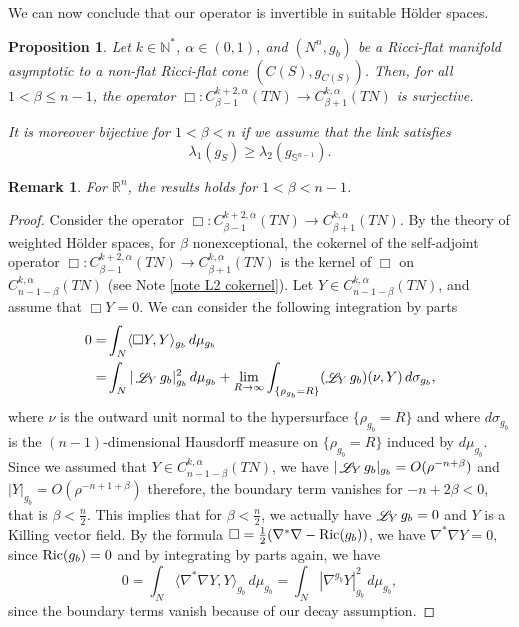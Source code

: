\documentclass[a4paper,11pt,reqno]{amsart}
\newtheorem{prop}[defn]{Proposition}
\newtheorem{rk}[defn]{Remark}
\def\Ric{\mathop{\rm Ric}\nolimits}
\def\Li{\mathop{\rm \mathscr{L}}\nolimits}
\def\Ric{\mathop{\rm Ric}\nolimits}
\def\Li{\mathop{\rm \mathscr{L}}\nolimits}
\numberwithin{equation}{section}
\begin{document}
	We can now conclude that our operator is invertible in suitable H\" older spaces.
	\begin{prop}\label{inverse deltadelta}
		Let $k\in \mathbb{N}^*$, $\alpha\in(0,1)$, and $(N^n,g_b)$ be a Ricci-flat manifold asymptotic to a non-flat Ricci-flat cone $(C(S),g_{C(S)})$. Then, for all $1<\beta\leq n-1$, the operator $\Box : C^{k+2,\alpha}_{\beta-1}(TN)\to C^{k,\alpha}_{\beta+1}(TN)$ is surjective. 
		
		It is moreover bijective for $1<\beta<n$ if we assume that the link satisfies
		$$\lambda_1(g_S)\geq \lambda_2(g_{\mathbb{S}^{n-1}}).$$
	\end{prop}
	\begin{rk}
		For $\mathbb{R}^n$, the results holds for $1<\beta<n-1$.
	\end{rk}
	\begin{proof}
		Consider the operator $\Box : C^{k+2,\alpha}_{\beta-1}(TN)\to C^{k,\alpha}_{\beta+1}(TN)$. By the theory of weighted Hölder spaces,  for $\beta$ nonexceptional, the cokernel of the self-adjoint operator $\Box: C^{k+2,\alpha}_{\beta-1}(TN)\to C^{k,\alpha}_{\beta+1}(TN)$ is the kernel of $\Box$ on $C^{k,\alpha}_{n-1-\beta}(TN)$ (see Note \ref{note L2 cokernel}). Let $Y\in C^{k,\alpha}_{n-1-\beta}(TN)$, and assume that $\Box Y=0$. We can consider the following integration by parts
		\begin{equation*}
		\begin{split}
		0=&\int_N \langle\Box Y,Y\rangle_{g_b}\,d\mu_{g_b} \\ =& \int_N |\Li_Yg_b|_{g_b}^2\,d\mu_{g_b}  + \lim_{R\to \infty} \int_{\{\rho_{g_b}= R\}} (\Li_Yg_b)(\nu,Y)\,d\sigma_{g_b} ,
		\end{split}
		\end{equation*}
		where $\nu$ is the outward  unit normal to the hypersurface $\{\rho_{g_b}= R\}$ and where $d\sigma_{g_b}$ is the $(n-1)$-dimensional Hausdorff measure on $\{\rho_{g_b}= R\}$ induced by $d\mu_{g_b}$. Since we assumed that $Y\in C^{k,\alpha}_{n-1-\beta}(TN)$, we have $|\Li_Yg_b|_{g_b} = O(\rho^{-n+\beta})$ and $|Y|_{g_b} =  O(\rho^{-n+1+\beta})$ therefore, the boundary term vanishes for $-n + 2\beta <0 $, that is $ \beta<\frac{n}{2}$. This implies that for $ \beta<\frac{n}{2}$, we actually have $\Li_Yg_b=0$ and $Y$ is a Killing vector field. By the formula $\Box = \frac{1}{2}(\nabla^*\nabla - \Ric(g_b))$, we have $\nabla^*\nabla Y = 0,$ since $\Ric(g_b)=0$ and by integrating by parts again, we have 
		\begin{equation*}
		0=\int_N \langle\nabla^*\nabla Y ,Y\rangle_{g_b}\,d\mu_{g_b} = \int_N |\nabla^{g_b} Y|^2_{g_b}\,d\mu_{g_b} ,
		\end{equation*}
		since the boundary terms vanish because of our decay assumption.
		

\end{proof}
\end{document}
